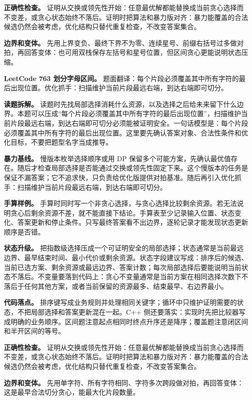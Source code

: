 \textbf{正确性检查。} 证明从交换或领先性开始：任意最优解都能替换成当前贪心选择而不变差，或贪心状态始终不落后。证明时把算法和暴力版对齐：暴力能覆盖的合法候选仍然会被考虑，优化结构只替代重复检查，不改变答案集合。

\textbf{边界和变体。} 先用上界变负、最终下界不为零、连续星号、前缀右括号过多做对拍，再回答变体：也可用双栈保存左括号和星号位置，但区间贪心更能说明状态压缩。

\noindent\textbf{LeetCode 763 划分字母区间。} 题面翻译：每个片段必须覆盖其中所有字符的最后出现位置。优化抓手：扫描维护当前片段最远右端，到达右端即可切分。

\textbf{读题拆解。} 读题时先找局部选择消耗什么资源，以及选择之后给未来留下什么边界。本题可以压成“每个片段必须覆盖其中所有字符的最后出现位置”，扫描维护当前片段最远右端，到达右端即可切分必须能被证明安全。一句话模型是：每个片段必须覆盖其中所有字符的最后出现位置。这里要先确认答案对象、合法性条件和优化目标，不要把题型名字当成推导。

\textbf{暴力基线。} 慢版本枚举选择顺序或用 DP 保留多个可能方案，先确认最优值存在。随后才检查局部选择是否能通过交换或领先性固定下来。这个慢版本的任务是保证不漏答案；它不追求快，只负责给优化版提供对拍基准。随后再引入优化抓手：扫描维护当前片段最远右端，到达右端即可切分。

\textbf{手算样例。} 手算时同时写一个非贪心选择，与贪心选择比较剩余资源。若无法说明贪心后剩余资源不差，就不能直接下结论。手算表至少记录输入位置、状态变化、答案更新和停止条件。只写最终答案看不出边界，逐轮记录才能发现状态更新顺序是否错。

\textbf{状态升级。} 把指数级选择压成一个可证明安全的局部选择；状态通常是当前最远边界、最早结束时间、最小代价或剩余资源。状态字段建议写成：排序后的候选、当前已选方案、剩余资源或最远边界、答案计数；每次局部选择后要能说明当前状态不落后。不变量要落到代码上：贪心不变量通常是当前方案在相同选择次数下不落后于任何其他方案，或者当前保留的资源最多、结束最早、右边界最小。

\textbf{代码落点。} 排序键写成业务规则并处理相同关键字；循环中只维护证明需要的状态，不把局部选择和答案更新混在一起。C++ 侧还要落实：实现时先把比较器写成明确的业务顺序。区间题注意起点相同时终点升序还是降序；覆盖题注意闭区间和半开区间的等号。

\textbf{正确性检查。} 证明从交换或领先性开始：任意最优解都能替换成当前贪心选择而不变差，或贪心状态始终不落后。证明时把算法和暴力版对齐：暴力能覆盖的合法候选仍然会被考虑，优化结构只替代重复检查，不改变答案集合。

\textbf{边界和变体。} 先用单字符、所有字符相同、字符多次跨段做对拍，再回答变体：这是最早合法切分贪心，能最大化片段数量。


